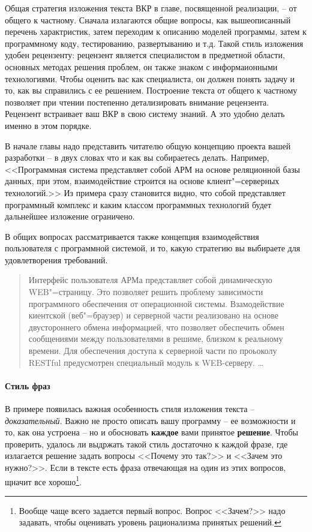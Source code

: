 \documentclass[a4paper,14pt,final]{extreport}
\begin{document}
Общая стратегия изложения текста ВКР в главе, посвященной реализации, -- от общего к частному.  Сначала излагаются общие вопросы, как вышеописанный перечень характристик, затем переходим к описанию моделей программы, затем к программному коду, тестированию, развертыванию и т.д.  Такой стиль изложения удобен рецензенту: рецензент является специалистом в предметной области, основных методах решения проблем, он также знаком с информаионными технологиями.  Чтобы оценить вас как специалиста, он должен понять задачу и то, как вы справились с ее решением.  Построение текста от общего к частному позволяет при чтении постепенно детализировать внимание рецензента.  Рецензент встраивает ваш ВКР в свою систему знаний.  А это удобно делать именно в этом порядке.

В начале главы надо представить читателю общую концепцию проекта вашей разработки -- в двух словах что и как вы собираетесь делать.  Например, <<Программная система представляет собой АРМ на основе реляционной базы данных, при этом, взаимодействие строится на основе клиент"=серверных технологий.>>  Из примера сразу становится видно, что собой представляет программный комплекс и каким классом программных технологий будет дальнейшее изложение ограничено.

В общих вопросах рассматривается также концепция взаимодействия пользователя с программной системой, и то, какую стратегию вы выбираете для удовлетворения требований.
\begin{quote}
  Интерфейс пользователя АРМа представляет собой динамическую WEB"=страницу.  Это позволяет решить проблему зависимости программного обеспечения от операционной системы.  Взамодействие киентской (веб"=браузер) и серверной части реализовано на основе двустороннего обмена информацией, что позволяет обеспечить обмен сообщениями между пользователями в решиме, близком к реальному времени.  Для обеспечения доступа к серверной части по проьоколу RESTful предусмотрен специальный модуль к WEB-серверу. \ldots{}
\end{quote}

\paragraph{Стиль фраз}

В примере появилась важная особенность стиля изложения текста -- \emph{доказательный}.  Важно не просто описать вашу программу -- ее возможности и то, как она устроена -- но и обосновать \textbf{каждое} вами принятое \textbf{решение}.  Чтобы проверить, удалось ли выдржать такой стиль достаточно к каждой фразе, где излагается решение задать вопросы <<Почему это так?>> и <<Зачем это нужно?>>.  Если в тексте есть фраза отвечающая на один из этих вопросов, щначит все хорошо\footnote{Вообще чаще всего задается первый вопрос.  Вопрос <<Зачем?>> надо задавать, чтобы оценивать уровень рационализма принятых решений.}.
\end{document}
